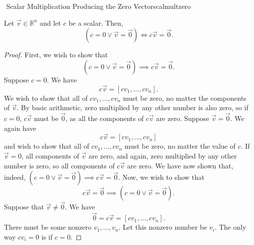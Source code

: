     \begin{theorem}{\Stop\,\,Scalar Multiplication Producing the Zero Vector}{scalmultzero}

        Let \(\vec{v}\in\mathbb{R}^n\) and let \(c\) be a scalar. Then,
        \begin{equation*}
            (c=0\vee\vec{v}=\vec{0})\iff c\vec{v}=\vec{0}.
        \end{equation*}
        \begin{proof}
            First, we wish to show that 
            \begin{equation*}
                (c=0\vee\vec{v}=\vec{0})\implies c\vec{v}=\vec{0}.
            \end{equation*}
            Suppose \(c=0\). We have
            \begin{equation*}
                c\vec{v}=[cv_1,\ldots,cv_n].
            \end{equation*}
            We wish to show that all of \(cv_1,\ldots,cv_n\) must be zero, no matter the components of \(\vec{v}\). By basic arithmetic, zero multiplied by any other number is also zero, so if \(c=0\), \(c\vec{v}\) must be \(\vec{0}\), as all the components of \(c\vec{v}\) are zero. Suppose \(\vec{v}=\vec{0}\). We again have
            \begin{equation*}
                c\vec{v}=[cv_1,\ldots,cv_n]
            \end{equation*}
            and wish to show that all of \(cv_1,\ldots,cv_n\) must be zero, no matter the value of \(c\). If \(\vec{v}=0\), all components of \(\vec{v}\) are zero, and again, zero multiplied by any other number is zero, so all components of \(c\vec{v}\) are zero. We have now shown that, indeed, \((c=0\vee\vec{v}=\vec{0})\implies c\vec{v}=\vec{0}\). Now, we wish to show that
            \begin{equation*}
                c\vec{v}=\vec{0}\implies(c=0\vee\vec{v}=\vec{0}).
            \end{equation*}
            Suppose that \(\vec{v}\neq\vec{0}\). We have 
            \begin{equation*}
                \vec{0}=c\vec{v}=[cv_1,\ldots,cv_n].
            \end{equation*}
            There must be some nonzero \(v_1,\ldots,v_n\). Let this nonzero number be \(v_i\). The only way \(cv_i=0\) is if \(c=0\).
        \end{proof} 
        
    \end{theorem}


